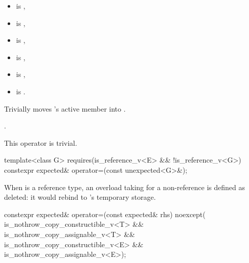 \begin{itemdescr}
\pnum
\constraints
\begin{itemize}
\item {} is ,
\item {} is ,
\item {} is ,
\item {} is ,
\item {} is ,
\item {} is .
\end{itemize}

\pnum
\effects
Trivially moves 's active member into .

\pnum
\returns
{}.

\pnum
\remarks
This operator is trivial.
\end{itemdescr}

%
\begin{itemdecl}
template<class G>
  requires(is_reference_v<E> && !is_reference_v<G>)
constexpr expected& operator=(const unexpected<G>&);
\end{itemdecl}

\begin{itemdescr}
\pnum
\remarks
When  is a reference type, an overload taking  for a non-reference  is defined as deleted: it would rebind  to 's temporary storage.
\end{itemdescr}

%
\begin{itemdecl}
constexpr expected& operator=(const expected& rhs) noexcept(
    is_nothrow_copy_constructible_v<T> && is_nothrow_copy_assignable_v<T> &&
    is_nothrow_copy_constructible_v<E> && is_nothrow_copy_assignable_v<E>);
\end{itemdecl}

